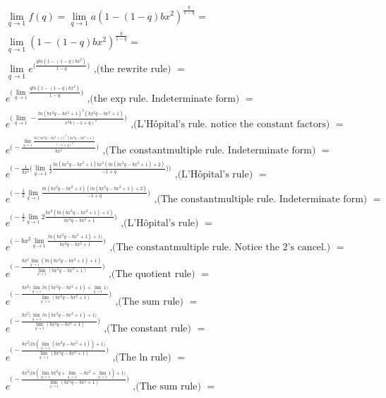 \begin{align*}
&\lim_{q \to 1} f(q) = \lim_{q \to 1} a(1-(1-q)bx^2)^{\frac{q}{1-q}}= \\
&\lim_{q \to 1}(1-(1-q)bx^2)^{\frac{q}{1-q}}= \\
&\lim_{q \to 1}e^{\big(\frac{q ln (1-(1-q)bx^2)}{1-q}\big)}\text{ ,(the rewrite rule) }= \\
&e^{\big(\lim_{q \to 1}\frac{q ln (1-(1-q)bx^2)}{1-q}\big)}\text{ ,(the exp rule. Indeterminate form) }= \\ 
&e^{\big(\lim_{q \to 1}-\frac{ln(bx^2q-bx^2+1)^2(bx^2q-bx^2+1)}{x^2b(-1+q)^2}\big)}\text{ ,(L'Hôpital's rule. notice the constant factors) }= \\  
&e^{\bigg(-\frac{\lim_{q \to 1}\frac{ln(bx^2q-bx^2+1)^2(bx^2q-bx^2+1)}{(-1+q)^2}}{bx^2}\bigg)}\text{ ,(The constantmultiple rule. Indeterminate form) }= \\  
&e^{\bigg(-\frac{1}{bx^2}\big( \lim_{q \to 1} \frac{1}{2} \frac{ln(bx^2q-bx^2+1)bx^2(ln(bx^2q-bx^2+1)+2)}{-1+q} \big) \bigg) }\text{ ,(L'Hôpital's rule) }= \\ 
&e^{\bigg(-\frac{1}{2} \lim_{q\to 1}\frac{ln(bx^2q-bx^2+1)(ln(bx^2q-bx^2+1)+2)}{-1+q} \bigg) }\text{ ,(The constantmultiple rule. Indeterminate form) }= \\ 
&e^{\bigg(-\frac{1}{2} \lim_{q\to 1}2\frac{bx^2 (ln(bx^2q-bx^2+1)+1)}{bx^2q-bx^2+1} \bigg) }\text{ ,(L'Hôpital's rule) }= \\   
&e^{\bigg(-bx^2 \lim_{q \to 1}\frac{ln(bx^2q-bx^2+1)+1)}{bx^2q-bx^2+1} \bigg) }\text{ ,(The constantmultiple rule. Notice the 2's cancel.) }= \\   
&e^{\Bigg(-\frac{bx^2 \lim_{q \to 1}(ln(bx^2q-bx^2+1)+1)}{\lim_{q \to 1}(bx^2q-bx^2+1)}\Bigg)}\text{ ,(The quotient rule) }= \\  
&e^{\Bigg(-\frac{bx^2 \big( \lim_{q \to 1}ln(bx^2q-bx^2+1)+ \lim_{q \to 1} 1\big)}{\lim_{q \to 1}(bx^2q-bx^2+1)}\Bigg)}\text{ ,(The sum rule) }= \\  
&e^{\Bigg(-\frac{bx^2 \big( \lim_{q \to 1}ln(bx^2q-bx^2+1)+ 1\big)}{\lim_{q \to 1}(bx^2q-bx^2+1)}\Bigg)}\text{ ,(The constant rule) }= \\  
&e^{\Bigg(-\frac{bx^2 \big( ln( \lim_{q \to 1}(bx^2q-bx^2+1))+ 1 \big)}{\lim_{q \to 1}(bx^2q-bx^2+1)}\Bigg)}\text{ ,(The ln rule) }= \\ 
&e^{\Bigg(-\frac{bx^2 \big( ln( \lim_{q \to 1}bx^2q + \lim_{q \to 1}-bx^2 + \lim_{q \to 1}1)+ 1 \big)}{\lim_{q \to 1}(bx^2q-bx^2+1)}\Bigg)}\text{ ,(The sum rule) }= \\  

\end{align*}
